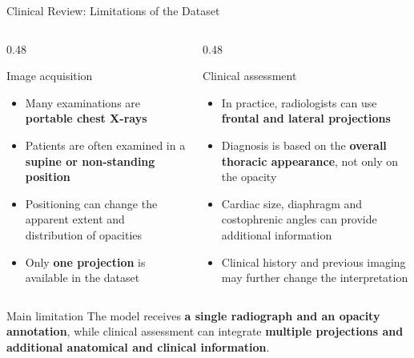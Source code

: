 \documentclass[aspectratio=169,11pt]{beamer}
\begin{document}
\begin{frame}{Clinical Review: Limitations of the Dataset}

\begin{columns}[t]

\begin{column}{0.48\textwidth}

\begin{block}{Image acquisition}
\small
\begin{itemize}
    \item Many examinations are \textbf{portable chest X-rays}
    \item Patients are often examined in a \textbf{supine or non-standing position}
    \item Positioning can change the apparent extent and distribution of opacities
    \item Only \textbf{one projection} is available in the dataset
\end{itemize}
\end{block}

\end{column}

\begin{column}{0.48\textwidth}

\begin{block}{Clinical assessment}
\small
\begin{itemize}
    \item In practice, radiologists can use \textbf{frontal and lateral projections}
    \item Diagnosis is based on the \textbf{overall thoracic appearance}, not only on the opacity
    \item Cardiac size, diaphragm and costophrenic angles can provide additional information
    \item Clinical history and previous imaging may further change the interpretation
\end{itemize}
\end{block}

\end{column}

\end{columns}

\vspace{0.3cm}

\begin{alertblock}{Main limitation}
\centering
\small
The model receives \textbf{a single radiograph and an opacity annotation},
while clinical assessment can integrate \textbf{multiple projections and additional anatomical and clinical information}.
\end{alertblock}

\end{frame}
\end{document}
